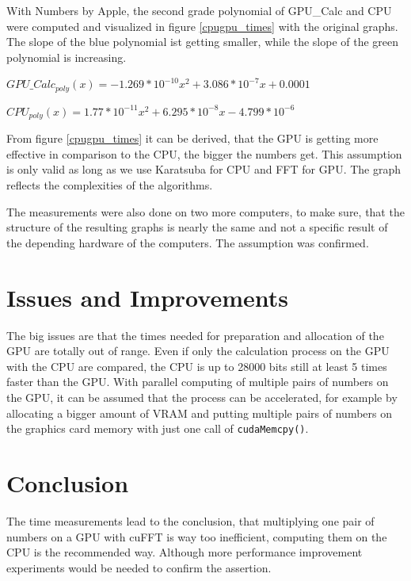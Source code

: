 \documentclass[12pt,a4paper]{article}
\begin{document}
 With Numbers by Apple, the second grade polynomial of GPU\_Calc and CPU were computed and visualized in figure \ref{cpugpu_times} with the original graphs. The slope of the blue polynomial ist getting smaller, while the slope of the green polynomial is increasing.

\begin{center}
    $GPU\_Calc_{poly}(x) = -1.269*10^{-10}x^2 + 3.086*10^{-7}x + 0.0001$
\end{center}

\begin{center}
    $CPU_{poly}(x) = 1.77*10^{-11}x^2 + 6.295*10^{-8}x - 4.799*10^{-6}$
\end{center}

From figure \ref{cpugpu_times} it can be derived, that the GPU is getting more effective in comparison to the CPU, the bigger the numbers get. This assumption is only valid as long as we use Karatsuba for CPU and FFT for GPU. The graph reflects the complexities of the algorithms.

The measurements were also done on two more computers, to make sure, that the structure of the resulting graphs is nearly the same and not a specific result of the depending hardware of the computers. The assumption was confirmed.


\section{Issues and Improvements}
The big issues are that the times needed for preparation and allocation of the GPU are totally out of range. Even if only the calculation process on the GPU with the CPU are compared, the CPU is up to 28000 bits still at least 5 times faster than the GPU. With parallel computing of multiple pairs of numbers on the GPU, it can be assumed that the process can be accelerated, for example by allocating a bigger amount of VRAM and putting multiple pairs of numbers on the graphics card memory with just one call of \texttt{cudaMemcpy()}.

\section{Conclusion}
The time measurements lead to the conclusion, that multiplying one pair of numbers on a GPU with cuFFT is way too inefficient, computing them on the CPU is the recommended way. Although more performance improvement experiments would be needed to  confirm the assertion.


\end{document}
